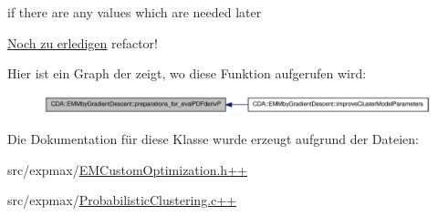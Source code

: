 if there are any values which are needed later 

\begin{Desc}
\item[\hyperlink{todo__todo000001}{Noch zu erledigen}]refactor! \end{Desc}


Hier ist ein Graph der zeigt, wo diese Funktion aufgerufen wird:\nopagebreak
\begin{figure}[H]
\begin{center}
\leavevmode
\includegraphics[width=335pt]{classCDA_1_1EMMbyGradientDescent_ad089403a73bd611cec7b40da92e4adb9_icgraph}
\end{center}
\end{figure}




Die Dokumentation für diese Klasse wurde erzeugt aufgrund der Dateien:\begin{DoxyCompactItemize}
\item 
src/expmax/\hyperlink{EMCustomOptimization_8h_09_09}{EMCustomOptimization.h++}\item 
src/expmax/\hyperlink{ProbabilisticClustering_8c_09_09}{ProbabilisticClustering.c++}\end{DoxyCompactItemize}
